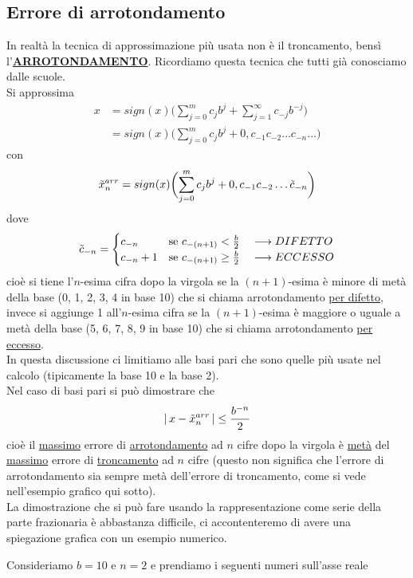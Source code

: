 \subsection{Errore di arrotondamento}
In realtà la tecnica di approssimazione più usata non è il troncamento, bensì l'\uline{\textbf{ARROTONDAMENTO}}. Ricordiamo questa tecnica che tutti già conosciamo dalle scuole. \\
Si approssima 
\[ \begin{split}
    x & = sign(x)\biggl( \sum_{j=0}^m c_j b^j + \sum_{j=1}^\infty c_{-j} b^{-j} \biggr) \\
    & = sign(x) \biggl( \sum_{j=0}^m c_j b^j + 0,c_{-1}c_{-2} \dotsc c_{-n} \dotsc \biggr) 
\end{split} \]
con \[ \Tilde{x}_n^{arr} = sign(x) \biggl( \sum_{j=0}^m c_j b^j + 0,c_{-1}c_{-2} \dotsc \Tilde{c}_{-n} \biggr) \]
dove \[\Tilde{c}_{-n} = 
\begin{cases}
    c_{-n} & \text{se $c_{-(n+1)} < \frac{b}{2} \quad \longrightarrow DIFETTO$} \\
    c_{-n}+1 & \text{se $c_{-(n+1)} \ge \frac{b}{2} \quad \longrightarrow ECCESSO$}
\end{cases}
\]
cioè si tiene l'$n$-esima cifra dopo la virgola se la $(n+1)$-esima è minore di metà della base (0, 1, 2, 3, 4 in base 10) che si chiama arrotondamento \uline{per difetto}, invece si aggiunge 1 all'$n$-esima cifra se la $(n+1)$-esima è maggiore o uguale a metà della base (5, 6, 7, 8, 9 in base 10) che si chiama arrotondamento \uline{per eccesso}.\\
In questa discussione ci limitiamo alle basi pari che sono quelle più usate nel calcolo (tipicamente la base 10 e la base 2). \\
Nel caso di basi pari si può dimostrare che
\[ \lvert \, x - \Tilde{x}_n^{arr} \,\rvert \le \frac{b^{-n}}{2}\]
cioè il \uline{massimo} errore di \uline{arrotondamento} ad $n$ cifre dopo la virgola è \uline{metà} del \uline{massimo} errore di \uline{troncamento} ad $n$ cifre (questo non significa che l'errore di arrotondamento sia sempre metà dell'errore di troncamento, come si vede nell'esempio grafico qui sotto).\\
La dimostrazione che si può fare usando la rappresentazione come serie della parte frazionaria è abbastanza difficile, ci accontenteremo di avere una spiegazione grafica con un esempio numerico.
\begin{esempio} \end{esempio}
Consideriamo $b=10$ e $n=2$ e prendiamo i seguenti numeri sull'asse reale 
